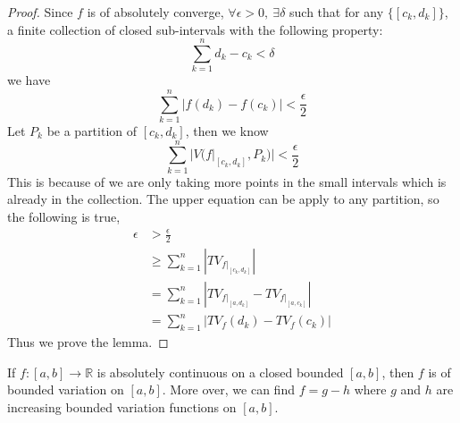 \documentclass[lang=en, 12pt]{elegantbook}
\newcommand{\RR}{\mathbb{R}}
\begin{document}
            \begin{proof}
                Since $f$ is of absolutely converge, $\forall \epsilon>0, \ \exists \delta$ such that for any  
            $\{[c_k, d_k]\}$, a finite collection of closed sub-intervals with the following property:
                $$\sum_{k=1}^n d_k -c_k < \delta$$
                we have
                $$\sum_{k=1}^n |f(d_k) -f(c_k)| < \frac{\epsilon}{2}$$
                Let $P_k$ be a partition of $[c_k, d_k]$, then we know 
                $$\sum_{k=1}^n |V(f|_{[c_k,d_k]},P_k)| < \frac{\epsilon}{2}$$
                This is because of we are only taking more points in the small intervals which is already in the collection.
            The upper equation can be apply to any partition, so the following is true,
                \begin{equation*}
                    \begin{aligned}
                        \epsilon &> \frac{\epsilon}{2}\\
                        &\geq \sum_{k=1}^n |TV_{f|_{[c_k,d_k]}}|\\
                        &=\sum_{k=1}^n |TV_{f|_{[a,d_k]}} -TV_{f|_{[a,c_k]}}|\\
                        &=\sum_{k=1}^n |TV_f(d_k) -TV_f(c_k)|
                    \end{aligned}
                \end{equation*}
                Thus we prove the lemma.
            \end{proof}
        \begin{theorem}
            If $f:[a,b] \to \RR$ is absolutely continuous on a closed bounded $[a,b]$, then $f$ is of bounded variation on $[a,b]$. More over,
        we can find $f= g-h$ where $g$ and $h$ are increasing bounded variation functions on $[a,b]$.
        \end{theorem}
\end{document}

